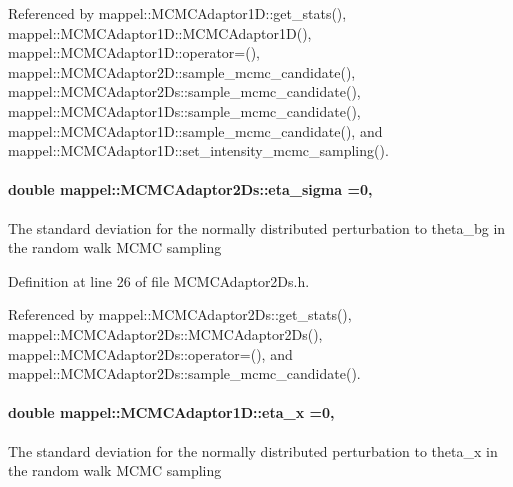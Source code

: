 Referenced by mappel\+::\+M\+C\+M\+C\+Adaptor1\+D\+::get\+\_\+stats(), mappel\+::\+M\+C\+M\+C\+Adaptor1\+D\+::\+M\+C\+M\+C\+Adaptor1\+D(), mappel\+::\+M\+C\+M\+C\+Adaptor1\+D\+::operator=(), mappel\+::\+M\+C\+M\+C\+Adaptor2\+D\+::sample\+\_\+mcmc\+\_\+candidate(), mappel\+::\+M\+C\+M\+C\+Adaptor2\+Ds\+::sample\+\_\+mcmc\+\_\+candidate(), mappel\+::\+M\+C\+M\+C\+Adaptor1\+Ds\+::sample\+\_\+mcmc\+\_\+candidate(), mappel\+::\+M\+C\+M\+C\+Adaptor1\+D\+::sample\+\_\+mcmc\+\_\+candidate(), and mappel\+::\+M\+C\+M\+C\+Adaptor1\+D\+::set\+\_\+intensity\+\_\+mcmc\+\_\+sampling().

\paragraph[{\texorpdfstring{eta\+\_\+sigma}{eta_sigma}}]{\setlength{\rightskip}{0pt plus 5cm}double mappel\+::\+M\+C\+M\+C\+Adaptor2\+Ds\+::eta\+\_\+sigma =0\hspace{0.3cm}{\ttfamily [protected]}, {\ttfamily [inherited]}}\hypertarget{classmappel_1_1MCMCAdaptor2Ds_ae5305087fd5abee9b38324be42d57a70}{}\label{classmappel_1_1MCMCAdaptor2Ds_ae5305087fd5abee9b38324be42d57a70}
The standard deviation for the normally distributed perturbation to theta\+\_\+bg in the random walk M\+C\+MC sampling 

Definition at line 26 of file M\+C\+M\+C\+Adaptor2\+Ds.\+h.



Referenced by mappel\+::\+M\+C\+M\+C\+Adaptor2\+Ds\+::get\+\_\+stats(), mappel\+::\+M\+C\+M\+C\+Adaptor2\+Ds\+::\+M\+C\+M\+C\+Adaptor2\+Ds(), mappel\+::\+M\+C\+M\+C\+Adaptor2\+Ds\+::operator=(), and mappel\+::\+M\+C\+M\+C\+Adaptor2\+Ds\+::sample\+\_\+mcmc\+\_\+candidate().

\paragraph[{\texorpdfstring{eta\+\_\+x}{eta_x}}]{\setlength{\rightskip}{0pt plus 5cm}double mappel\+::\+M\+C\+M\+C\+Adaptor1\+D\+::eta\+\_\+x =0\hspace{0.3cm}{\ttfamily [protected]}, {\ttfamily [inherited]}}\hypertarget{classmappel_1_1MCMCAdaptor1D_ae5787e38c9cef6168acf6fc5d3216693}{}\label{classmappel_1_1MCMCAdaptor1D_ae5787e38c9cef6168acf6fc5d3216693}
The standard deviation for the normally distributed perturbation to theta\+\_\+x in the random walk M\+C\+MC sampling 

